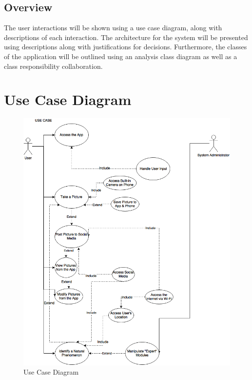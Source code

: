 \documentclass[]{article}
\begin{document}

\subsection{Overview}
\label{sub:overview}
\indent\indent The user interactions will be shown using a use case diagram, along with descriptions of each interaction.  The architecture for the system will be presented using descriptions along with justifications for decisions.  Furthermore, the classes of the application will be outlined using an analysis class diagram as well as a class responsibility collaboration. 


\section{Use Case Diagram}

\begin{figure}[!hb]
	\includegraphics[width=\linewidth]{usecase.png}
	\caption{Use Case Diagram}
\end{figure}
\end{document}
